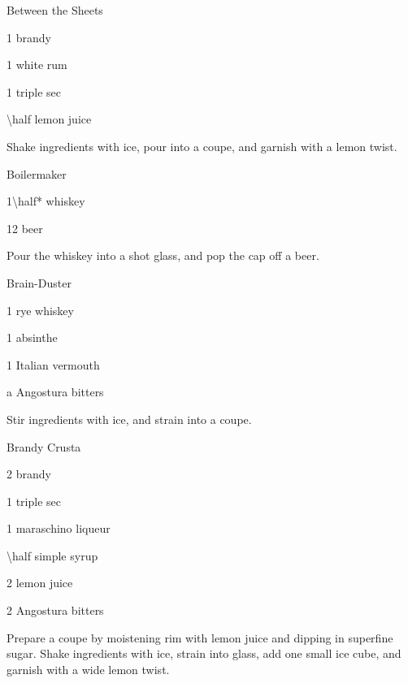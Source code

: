 \begin{Cocktail}{Between the Sheets}
	\begin{Ingredients}
	\item \SI{1}{\oz} brandy
	\item \SI{1}{\oz} white rum
	\item \SI{1}{\oz} triple sec
	\item \SI{\half}{\oz} lemon juice
	\end{Ingredients}
	
	\begin{Instructions}
	Shake ingredients with ice, pour into a coupe, and garnish with a lemon twist.
	\end{Instructions}
\end{Cocktail}

\begin{Cocktail}{Boilermaker}
	\begin{Ingredients}
	\item \SI{1\half*}{\oz} whiskey
	\item \SI{12}{\oz} beer
	\end{Ingredients}
	
	\begin{Instructions}
	Pour the whiskey into a shot glass, and pop the cap off a beer.
	\end{Instructions}
\end{Cocktail}

\begin{Cocktail}{Brain-Duster}
	\begin{Ingredients}
	\item \SI{1}{\oz} rye whiskey
	\item \SI{1}{\oz} absinthe
	\item \SI{1}{\oz} Italian vermouth
	\item a \si{\dash} Angostura bitters
	\end{Ingredients}
	
	\begin{Instructions}
	Stir ingredients with ice, and strain into a coupe.
	\end{Instructions}
\end{Cocktail}

\begin{Cocktail}{Brandy Crusta}
	\begin{Ingredients}
	\item \SI{2}{\oz} brandy
	\item \SI{1}{\tsp} triple sec
	\item \SI{1}{\tsp} maraschino liqueur
	\item \SI{\half}{\tsp} simple syrup
	\item \SI{2}{\tsp} lemon juice
	\item 2 \si{\dashes} Angostura bitters
	\end{Ingredients}
	
	\begin{Instructions}
	Prepare a coupe by moistening rim with lemon juice and dipping in superfine sugar.  Shake ingredients with ice, strain into glass, add one small ice cube, and garnish with a wide lemon twist.
	\end{Instructions}
\end{Cocktail}

